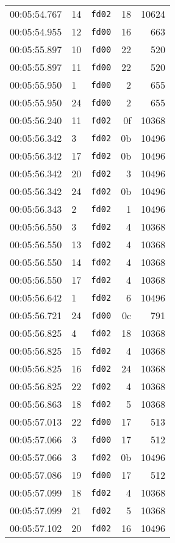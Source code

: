 \documentclass{article}
\begin{document}
\begin{longtable}{lllrr}
00:05:54.767 & 14 & \texttt{fd02} & 18 & 10624 \\
00:05:54.955 & 12 & \texttt{fd00} & 16 & 663 \\
00:05:55.897 & 10 & \texttt{fd00} & 22 & 520 \\
00:05:55.897 & 11 & \texttt{fd00} & 22 & 520 \\
00:05:55.950 & 1 & \texttt{fd00} & 2 & 655 \\
00:05:55.950 & 24 & \texttt{fd00} & 2 & 655 \\
00:05:56.240 & 11 & \texttt{fd02} & 0f & 10368 \\
00:05:56.342 & 3 & \texttt{fd02} & 0b & 10496 \\
00:05:56.342 & 17 & \texttt{fd02} & 0b & 10496 \\
00:05:56.342 & 20 & \texttt{fd02} & 3 & 10496 \\
00:05:56.342 & 24 & \texttt{fd02} & 0b & 10496 \\
00:05:56.343 & 2 & \texttt{fd02} & 1 & 10496 \\
00:05:56.550 & 3 & \texttt{fd02} & 4 & 10368 \\
00:05:56.550 & 13 & \texttt{fd02} & 4 & 10368 \\
00:05:56.550 & 14 & \texttt{fd02} & 4 & 10368 \\
00:05:56.550 & 17 & \texttt{fd02} & 4 & 10368 \\
00:05:56.642 & 1 & \texttt{fd02} & 6 & 10496 \\
00:05:56.721 & 24 & \texttt{fd00} & 0c & 791 \\
00:05:56.825 & 4 & \texttt{fd02} & 18 & 10368 \\
00:05:56.825 & 15 & \texttt{fd02} & 4 & 10368 \\
00:05:56.825 & 16 & \texttt{fd02} & 24 & 10368 \\
00:05:56.825 & 22 & \texttt{fd02} & 4 & 10368 \\
00:05:56.863 & 18 & \texttt{fd02} & 5 & 10368 \\
00:05:57.013 & 22 & \texttt{fd00} & 17 & 513 \\
00:05:57.066 & 3 & \texttt{fd00} & 17 & 512 \\
00:05:57.066 & 3 & \texttt{fd02} & 0b & 10496 \\
00:05:57.086 & 19 & \texttt{fd00} & 17 & 512 \\
00:05:57.099 & 18 & \texttt{fd02} & 4 & 10368 \\
00:05:57.099 & 21 & \texttt{fd02} & 5 & 10368 \\
00:05:57.102 & 20 & \texttt{fd02} & 16 & 10496 \\

\end{longtable}
\end{document}

